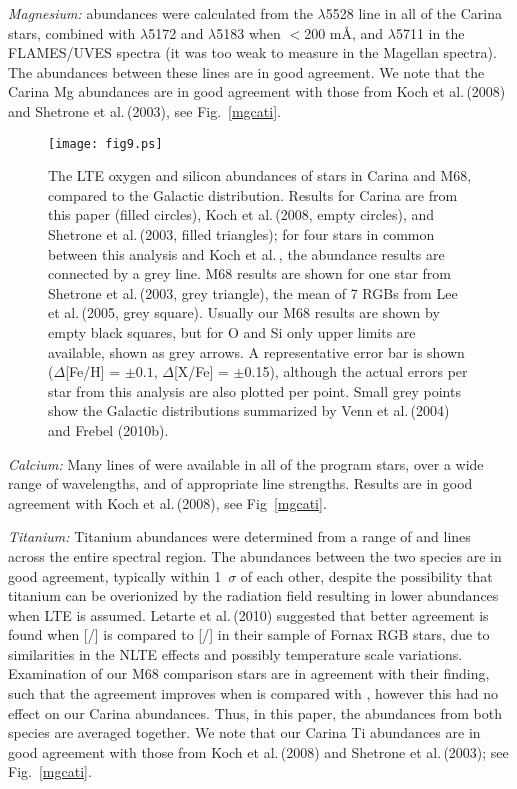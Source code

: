 \documentclass{emulateapj}
\newcommand\etal{{\rm et al.\,}}
\begin{document}
{\it Magnesium:}
 abundances were calculated from the $\lambda$5528 line
in all of the Carina stars, combined with $\lambda$5172 and $\lambda$5183
when $<$200 m\AA, and $\lambda$5711 in the FLAMES/UVES spectra
(it was too weak to measure in the Magellan spectra).  
The abundances between these lines are in good agreement.
We note that the Carina Mg abundances are in good
agreement with those from Koch \etal (2008) and 
Shetrone \etal (2003), see Fig.~\ref{mgcati}.
%


\begin{figure}[t]
\texttt{[image: fig9.ps]}
\caption{The LTE oxygen and silicon abundances of stars
in Carina and M68, compared to the Galactic distribution.   
Results for Carina are from this paper (filled circles), 
Koch \etal (2008, empty circles), and 
Shetrone \etal (2003, filled triangles); 
for four stars in common between this analysis 
and Koch \etal, the abundance results are connected by a 
grey line. 
M68 results are shown for one star from 
Shetrone \etal (2003, grey triangle), 
the mean of 7 RGBs from Lee \etal (2005, grey square).  
Usually our M68 results are shown by empty black squares,
but for O and Si only upper limits are available, shown
as grey arrows.   A representative error bar 
is shown ($\Delta$[Fe/H] = $\pm0.1$, $\Delta$[X/Fe] = $\pm$0.15), 
although the actual errors per star from 
this analysis are also plotted per point. 
%
Small grey points show the Galactic distributions summarized
by Venn \etal (2004) and Frebel (2010b). \\
}
\label{osi}
\end{figure}

 
{\it Calcium:}  Many lines of  were available in all of
the program stars, over a wide range of wavelengths, and of appropriate line 
strengths.    Results are in good agreement with Koch \etal (2008),
see Fig~\ref{mgcati}.    


{\it Titanium:}
Titanium abundances were determined from a range of 
  and  lines across the entire 
spectral region.   The abundances between
the two species are in good agreement, 
typically within 1~$\sigma$ of each other, despite the
possibility that titanium can be overionized by the 
radiation field
resulting in lower  abundances when
LTE is assumed.   
Letarte \etal (2010) suggested that better agreement is found
when [/] is compared to
 [/] in their sample of Fornax RGB
stars, due to similarities in the NLTE effects and possibly 
temperature scale variations.  Examination of our M68 comparison stars 
are in agreement with their finding, such that the agreement improves
when  is compared with , however this had 
no effect on our Carina abundances. 
Thus, in this paper, the abundances from both species are 
averaged together.
We note that our Carina Ti abundances are in good
agreement with those from Koch \etal (2008) and Shetrone \etal (2003); 
see Fig.~\ref{mgcati}. 
\end{document}
